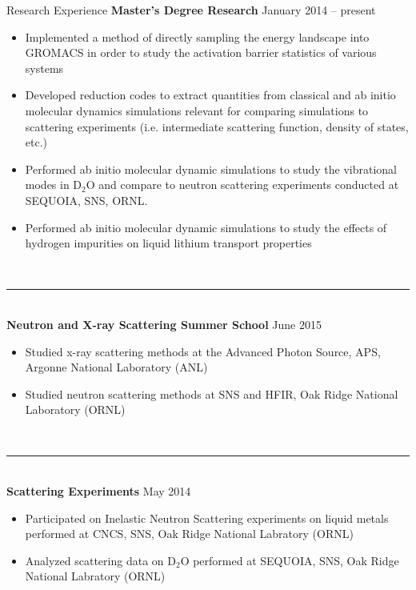\documentclass{resume} %
\begin{document}


\begin{rSection}{Research Experience}
	{\bf Master's Degree Research} \hfill {January 2014 -- present}
	\begin{itemize}
	\item Implemented a method of directly sampling the energy landscape into GROMACS in order to study the activation barrier statistics of various systems
	\item Developed reduction codes to extract quantities from classical and ab initio molecular dynamics simulations relevant for comparing simulations to scattering experiments (i.e. intermediate scattering function, density of states, etc.) 
	\item Performed ab initio molecular dynamic simulations to study the vibrational modes in D$_2$O and compare to neutron scattering experiments conducted at SEQUOIA, SNS, ORNL. 
	\item Performed ab initio molecular dynamic simulations to study the effects of hydrogen impurities on liquid lithium transport properties
	\end{itemize}
	\\
	{\centering\noindent\rule{5cm}{0.4pt}}
	\\
	{\bf Neutron and X-ray Scattering Summer School} \hfill {June 2015}
	\begin{itemize}
	\item Studied x-ray scattering methods at the Advanced Photon Source, APS, Argonne National Laboratory (ANL)
	\item Studied neutron scattering methods at SNS and HFIR, Oak Ridge National Laboratory (ORNL)
	\end{itemize}
	\\
	{\centering\noindent\rule{5cm}{0.4pt}}
	\\
	{\bf Scattering Experiments} \hfill {May 2014}
	\begin{itemize}
	\item Participated on Inelastic Neutron Scattering experiments on liquid metals performed at CNCS, SNS, Oak Ridge National Labratory (ORNL) 
	\item Analyzed scattering data on D$_2$O performed at SEQUOIA, SNS, Oak Ridge National Labratory (ORNL)
	\end{itemize}
	\\

\end{rSection}
\end{document}
